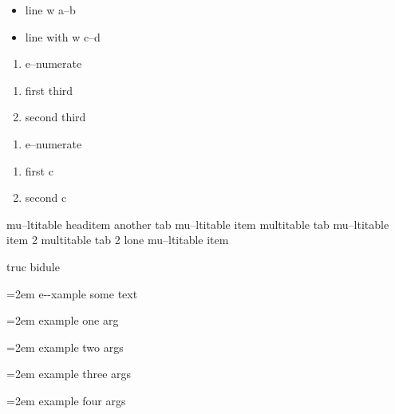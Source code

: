 \documentclass{book}
\begin{document}
\begin{titlepage}
\begin{itemize}[label=\hbox{} on a line]
\item line w a--b
\item line with w c--d
\end{itemize}

\begin{enumerate}[start=1]
\item e--numerate
\end{enumerate}

\begin{enumerate}[start=3]
\item first third
\item second third
\end{enumerate}

\begin{enumerate}[label=\alph*.]
\item e--numerate
\end{enumerate}

\begin{enumerate}[label=\alph*.,start=3]
\item first c
\item second c
\end{enumerate}

mu--ltitable headitem another tab
mu--ltitable item multitable tab
mu--ltitable item 2 multitable tab 2
%
lone mu--ltitable item

truc bidule

\par\begingroup\obeylines\obeyspaces\frenchspacing\leftskip=2em\relax\parskip=0pt\relax\ttfamily{}%
e{-}{-}xample  some
   text
\endgroup{}%

\par\begingroup\obeylines\obeyspaces\frenchspacing\leftskip=2em\relax\parskip=0pt\relax\ttfamily{}%
example one arg
\endgroup{}%

\par\begingroup\obeylines\obeyspaces\frenchspacing\leftskip=2em\relax\parskip=0pt\relax\ttfamily{}%
example two args
\endgroup{}%

\par\begingroup\obeylines\obeyspaces\frenchspacing\leftskip=2em\relax\parskip=0pt\relax\ttfamily{}%
example three args
\endgroup{}%

\par\begingroup\obeylines\obeyspaces\frenchspacing\leftskip=2em\relax\parskip=0pt\relax\ttfamily{}%
example four args
\endgroup{}%


\end{titlepage}
\end{document}
